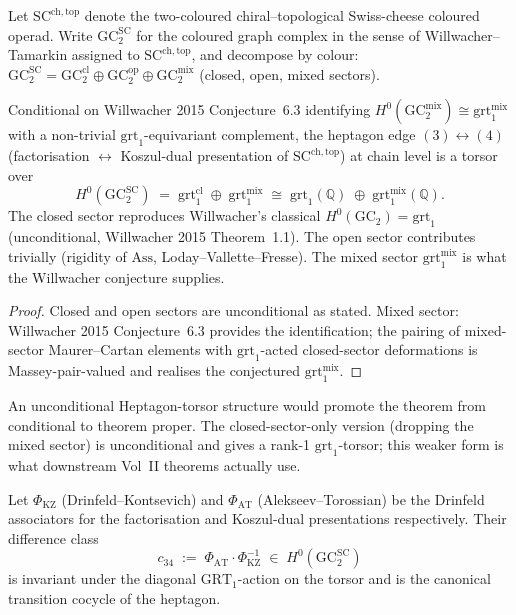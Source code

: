 \documentclass[11pt]{article}
\begin{document}
Let $\mathrm{SC}^{\mathrm{ch, top}}$ denote the two-coloured chiral--topological
Swiss-cheese coloured operad. Write $\mathrm{GC}_2^{\mathrm{SC}}$ for
the coloured graph complex in the sense of Willwacher--Tamarkin
assigned to $\mathrm{SC}^{\mathrm{ch, top}}$, and decompose by
colour:
$\mathrm{GC}_2^{\mathrm{SC}} = \mathrm{GC}_2^{\mathrm{cl}} \oplus
\mathrm{GC}_2^{\mathrm{op}} \oplus \mathrm{GC}_2^{\mathrm{mix}}$
(closed, open, mixed sectors).

\begin{theorem}
\label{thm:heptagon-torsor}
Conditional on Willwacher 2015 Conjecture~6.3 identifying
$H^0(\mathrm{GC}_2^{\mathrm{mix}}) \cong \mathrm{grt}_1^{\mathrm{mix}}$
with a non-trivial $\mathrm{grt}_1$-equivariant complement, the heptagon
edge $(3) \leftrightarrow (4)$
(factorisation $\leftrightarrow$ Koszul-dual presentation of
$\mathrm{SC}^{\mathrm{ch, top}}$) at chain level is a torsor over
\[
  H^0(\mathrm{GC}_2^{\mathrm{SC}})
  \;=\;
  \mathrm{grt}_1^{\mathrm{cl}} \;\oplus\; \mathrm{grt}_1^{\mathrm{mix}}
  \;\cong\;
  \mathrm{grt}_1(\mathbb{Q}) \;\oplus\; \mathrm{grt}_1^{\mathrm{mix}}(\mathbb{Q}).
\]
The closed sector reproduces Willwacher's classical $H^0(\mathrm{GC}_2) =
\mathrm{grt}_1$ (unconditional, Willwacher 2015 Theorem~1.1). The open
sector contributes trivially (rigidity of $\mathrm{Ass}$,
Loday--Vallette--Fresse). The mixed sector $\mathrm{grt}_1^{\mathrm{mix}}$
is what the Willwacher conjecture supplies.
\end{theorem}

\begin{proof}
Closed and open sectors are unconditional as stated. Mixed sector:
Willwacher 2015 Conjecture~6.3 provides the identification; the
pairing of mixed-sector Maurer--Cartan elements with
$\mathrm{grt}_1$-acted closed-sector deformations is Massey-pair-valued
and realises the conjectured $\mathrm{grt}_1^{\mathrm{mix}}$.
\end{proof}

\begin{remark}[Scope]
An unconditional Heptagon-torsor structure would promote the theorem
from conditional to theorem proper. The closed-sector-only version
(dropping the mixed sector) is unconditional and gives a rank-1
$\mathrm{grt}_1$-torsor; this weaker form is what downstream Vol~II
theorems actually use.
\end{remark}

\begin{corollary}
\label{cor:transition-cocycle-c34}
Let $\Phi_{\mathrm{KZ}}$ (Drinfeld--Kontsevich) and
$\Phi_{\mathrm{AT}}$ (Alekseev--Torossian) be the Drinfeld associators
for the factorisation and Koszul-dual presentations respectively.
Their difference class
\[
  c_{34} \;:=\; \Phi_{\mathrm{AT}} \cdot \Phi_{\mathrm{KZ}}^{-1}
  \;\in\;
  H^0(\mathrm{GC}_2^{\mathrm{SC}})
\]
is invariant under the diagonal $\mathrm{GRT}_1$-action on the torsor
and is the canonical transition cocycle of the heptagon.
\end{corollary}
\end{document}
